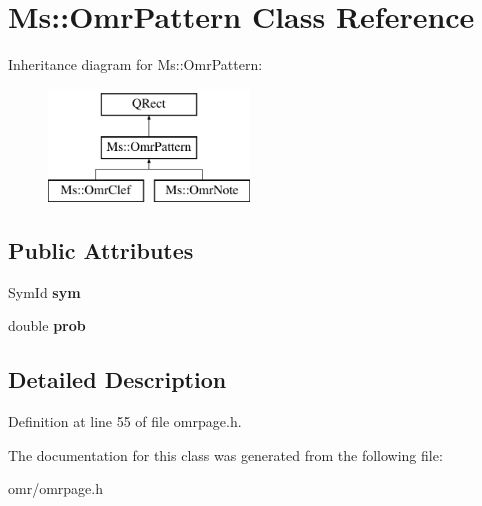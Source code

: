 \hypertarget{class_ms_1_1_omr_pattern}{}\section{Ms\+:\+:Omr\+Pattern Class Reference}
\label{class_ms_1_1_omr_pattern}
Inheritance diagram for Ms\+:\+:Omr\+Pattern\+:\begin{figure}[H]
\begin{center}
\leavevmode
\includegraphics[height=3.000000cm]{class_ms_1_1_omr_pattern}
\end{center}
\end{figure}
\subsection*{Public Attributes}
\begin{DoxyCompactItemize}
\item 
\mbox{\label{class_ms_1_1_omr_pattern_a9a6dc81cdfa08cd5d6d52b00dec8ff7a}} 
Sym\+Id {\bfseries sym}
\item 
\mbox{\label{class_ms_1_1_omr_pattern_a8bf897310379b7bcdc58472fcfce72c8}} 
double {\bfseries prob}
\end{DoxyCompactItemize}


\subsection{Detailed Description}


Definition at line 55 of file omrpage.\+h.



The documentation for this class was generated from the following file\+:\begin{DoxyCompactItemize}
\item 
omr/omrpage.\+h\end{DoxyCompactItemize}
